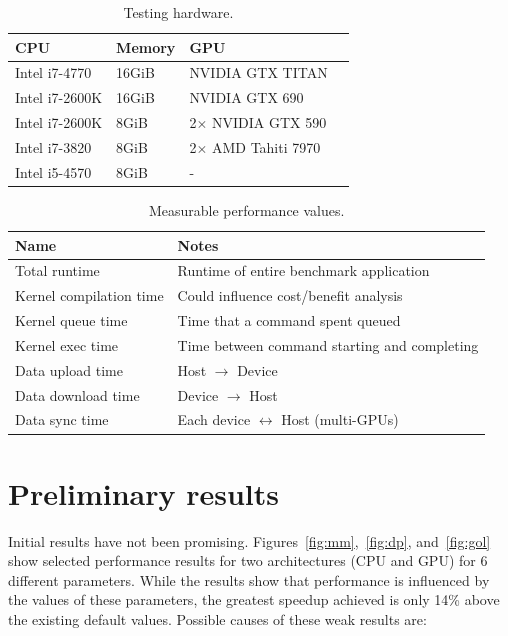 \begin{table}
\footnotesize
\centering
\begin{tabular}{| l | l | l | l |}
\hline
\textbf{CPU} & \textbf{Memory} & \textbf{GPU}\\
\hline
Intel i7-4770 & 16GiB & NVIDIA GTX TITAN\\
Intel i7-2600K & 16GiB & NVIDIA GTX 690\\
Intel i7-2600K & 8GiB & 2$\times$ NVIDIA GTX 590\\
Intel i7-3820 & 8GiB & 2$\times$ AMD Tahiti 7970\\
Intel i5-4570 & 8GiB & -\\
\hline
\end{tabular}
\caption{Testing hardware.}
\label{tab:hw}
\end{table}


\begin{table}
\footnotesize
\centering
\begin{tabular}{| l | l |}
  \hline
  \textbf{Name} & \textbf{Notes}\\
  \hline
  Total runtime & Runtime of entire benchmark application\\
  Kernel compilation time & Could influence cost/benefit analysis\\
  Kernel queue time & Time that a command spent queued\\
  Kernel exec time & Time between command starting and completing\\
  Data upload time & Host $\rightarrow$ Device\\
  Data download time & Device $\rightarrow$ Host\\
  Data sync time & Each device $\leftrightarrow$ Host (multi-GPUs)\\
  \hline
\end{tabular}
\caption{Measurable performance values.}
\label{tab:metric}
\end{table}

\section{Preliminary results}

Initial results have not been
promising. Figures~\ref{fig:mm},~\ref{fig:dp}, and~\ref{fig:gol} show
selected performance results for two architectures (CPU and GPU) for 6
different parameters. While the results show that performance is
influenced by the values of these parameters, the greatest speedup
achieved is only 14\% above the existing default values. Possible
causes of these weak results are:

